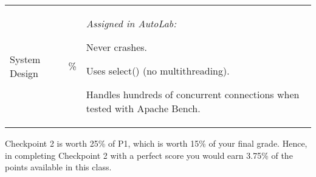 \begin{center}
\begin{tabular}{>{\centering\arraybackslash}m{1in}>{\centering\arraybackslash}m{1in}p{3in}}
  \hline
  \addlinespace[5pt]

  System Design&30\%&\vspace{-10pt} 
                              {\it Assigned in AutoLab:}
                              \begin{packed_itemize}
                                \item Never crashes.
                                \item Uses select() (no multithreading).
                                \item Handles hundreds of concurrent connections when tested with Apache Bench.
                              \end{packed_itemize}\\

\end{tabular}
\end{center}


\noindent Checkpoint 2 is worth 25\% of P1, which is worth 15\% of your final grade. Hence, in completing Checkpoint 2 with a perfect score you would earn 3.75\% of the points available in this class.


